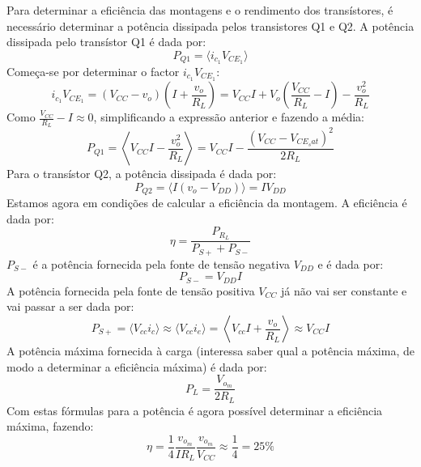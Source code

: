 \documentclass[%
  reprint,
  nofootinbib,
  amsmath,amssymb,
  aps,
  10pt,
  a4paper
]{revtex4-1}
\begin{document}
Para determinar a eficiência das montagens e o rendimento dos transístores, é necessário determinar a potência dissipada pelos transistores Q1 e Q2.
A potência dissipada pelo transístor Q1 é dada por:
\begin{equation}
P_{Q1}=\langle i_{c_1} V_{{CE}_1}\rangle
\end{equation}
Começa-se por determinar o factor $i_{c_1} V_{{CE}_1}$:
\begin{equation}
i_{c_1} V_{{CE}_1}=(V_{CC}-v_o)\left(I+\frac{v_o}{R_L}\right)=V_{CC}I+V_o\left(\frac{V_{CC}}{R_L}-I\right)-\frac{v_o^2}{R_L}
\end{equation}
Como $\frac{V_{CC}}{R_L}-I\approx0$, simplificando a expressão anterior e fazendo a média:
\begin{equation}
P_{Q1}=\left\langle V_{CC}I-\frac{v_o^2}{R_L} \right\rangle=V_{CC}I-\frac{(V_{CC}-V_{{CE}_sat})^2}{2R_L}
\end{equation}
Para o transístor Q2, a potência dissipada é dada por:
\begin{equation}
P_{Q2}=\langle I(v_o-V_{DD}) \rangle=IV_{DD}
\end{equation}
Estamos agora em condições de calcular a eficiência da montagem. A eficiência é dada por:
\begin{equation}
\eta=\frac{P_{R_L}}{P_{S+}+P_{S-}}
\end{equation}
$P_{S-}$ é a potência fornecida pela fonte de tensão negativa $V_{DD}$ e é dada por:
\begin{equation}
P_{S-}=V_{DD}I
\end{equation}
A potência fornecida pela fonte de tensão positiva $V_{CC}$ já não vai ser constante e vai passar a ser dada por:
\begin{equation}
P_{S+}=\langle V_{cc} i_c \rangle \approx \langle V_{cc} i_e \rangle =\left\langle V_{cc} I+\frac{v_o}{R_L} \right\rangle \approx V_{CC}I
\end{equation}
A potência máxima fornecida à carga (interessa saber qual a potência máxima, de modo a determinar a eficiência máxima) é dada por:
\begin{equation}
P_{L}=\frac{V_{o_m}}{2R_L}
\end{equation}
Com estas fórmulas para a potência é agora possível determinar a eficiência máxima, fazendo:
\begin{equation}
\eta=\frac{1}{4}\frac{v_{o_m}}{IR_L}\frac{v_{o_m}}{V_{CC}}\approx\frac{1}{4}=25\%
\end{equation}
\end{document}
